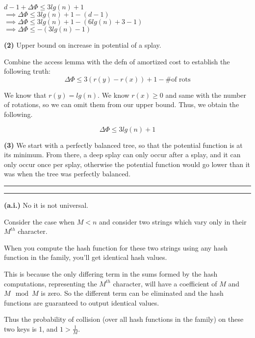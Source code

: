 \documentclass[11pt]{article}
\newcommand{\question}[2] {\vspace{.25in} \hrule\vspace{0.5em}
\noindent{\bf #1: #2} \vspace{0.5em}
\hrule \vspace{.10in}}
\renewcommand{\part}[1] {\vspace{.10in} {\bf (#1)}}
\begin{document}
$ d-1 + \Delta \Phi \leq 3 lg(n) + 1$\\
$ \implies \Delta \Phi \leq 3 lg(n) + 1 - (d - 1)$\\
$ \implies  \Delta \Phi \leq 3 lg(n) + 1 - (6 lg(n) + 3 - 1)$\\
$ \implies  \Delta \Phi \leq - (3 lg(n) - 1)$

\part{2} Upper bound on increase in potential of a splay.

Combine the access lemma with the defn of amortized cost to establish the following truth:
$$ \Delta \Phi \leq 3 (r(y) - r(x)) + 1 - \text{\# of rots}$$

We know that $r(y) = lg(n)$. We know $r(x) \geq 0$ and same with the number of rotations, so we can omit them from our upper bound.
Thus, we obtain the following.

$$ \Delta \Phi \leq 3 lg(n)  + 1$$

\part{3} 
We start with a perfectly balanced tree, so that the potential function is at its minimum.
From there, a deep splay can only occur after a splay, and it can only occur once per splay, otherwise the potential function would go lower than it was when the tree was perfectly balanced.




\question{2}{Universal Hashing}
\part{a.i.}
No it is not universal.

Consider the case when $M < n$ and consider two strings which vary only in their $M^{th}$ character.

When you compute the hash function for these two strings using any hash function in the family, you'll get identical hash values.

This is because the only differing term in the sums formed by the hash computations, representing the $M^{th}$ character, will have a coefficient of $M$ and $M \mod M$ is zero.
So the different term can be eliminated and the hash functions are guaranteed to output identical values.

Thus the probability of collision (over all hash functions in the family) on these two keys is 1, and $1 > \frac{1}{M}$.
\end{document}
